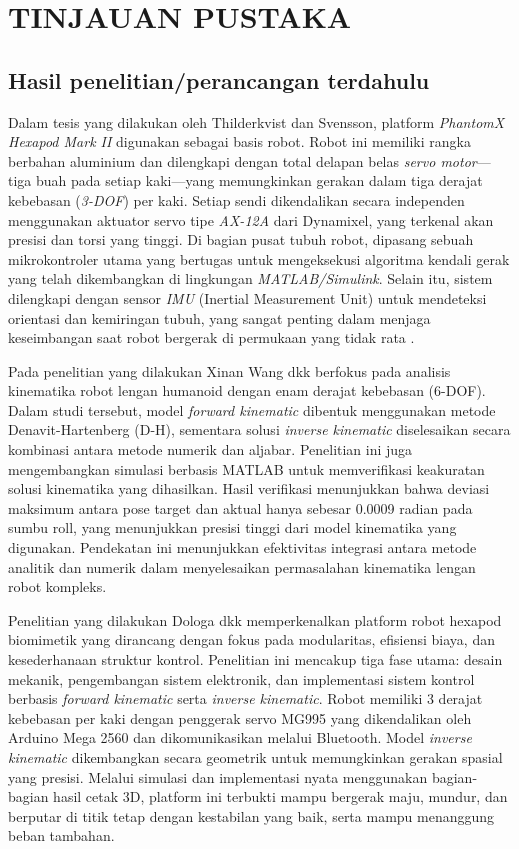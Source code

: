 \chapter{TINJAUAN PUSTAKA}
\label{chap:tinjauanpustaka}


\section{Hasil penelitian/perancangan terdahulu}
\label{Hasil penelitian/perancangan terdahulu}
Dalam tesis yang dilakukan oleh Thilderkvist dan Svensson,
platform \emph{PhantomX Hexapod Mark II} digunakan sebagai basis robot. Robot
ini memiliki rangka berbahan aluminium dan dilengkapi dengan total delapan belas
\emph{servo motor}—tiga buah pada setiap kaki—yang memungkinkan gerakan dalam
tiga derajat kebebasan (\emph{3-DOF}) per kaki. Setiap sendi dikendalikan secara
independen menggunakan aktuator servo tipe \emph{AX-12A} dari Dynamixel, yang
terkenal akan presisi dan torsi yang tinggi. Di bagian pusat tubuh robot,
dipasang sebuah mikrokontroler utama yang bertugas untuk mengeksekusi algoritma
kendali gerak yang telah dikembangkan di lingkungan \emph{MATLAB/Simulink}.
Selain itu, sistem dilengkapi dengan sensor \emph{IMU} (Inertial Measurement
Unit) untuk mendeteksi orientasi dan kemiringan tubuh, yang sangat penting dalam
menjaga keseimbangan saat robot bergerak di permukaan yang tidak rata
\parencite{Thilderkvist2015}.

Pada penelitian yang dilakukan Xinan Wang dkk berfokus pada analisis kinematika robot 
lengan humanoid dengan enam derajat kebebasan (6-DOF). Dalam studi tersebut, model 
\emph{forward kinematic} dibentuk menggunakan metode Denavit-Hartenberg (D-H), sementara solusi 
\emph{inverse kinematic} diselesaikan secara kombinasi antara metode numerik dan aljabar. 
Penelitian ini juga mengembangkan simulasi berbasis MATLAB untuk memverifikasi 
keakuratan solusi kinematika yang dihasilkan. Hasil verifikasi menunjukkan bahwa 
deviasi maksimum antara pose target dan aktual hanya sebesar 0.0009 radian pada sumbu 
roll, yang menunjukkan presisi tinggi dari model kinematika yang digunakan. Pendekatan 
ini menunjukkan efektivitas integrasi antara metode analitik dan numerik dalam 
menyelesaikan permasalahan kinematika lengan robot kompleks. \parencite{wang2024kinematics}

\sloppy
Penelitian yang dilakukan Dologa dkk memperkenalkan platform robot hexapod
biomimetik yang dirancang dengan fokus pada modularitas, efisiensi biaya, dan
kesederhanaan struktur kontrol. Penelitian ini mencakup tiga fase utama: desain
mekanik, pengembangan sistem elektronik, dan implementasi sistem kontrol
berbasis \emph{forward kinematic} serta \emph{inverse kinematic}. Robot memiliki 3 derajat
kebebasan per kaki dengan penggerak servo MG995 yang dikendalikan oleh
Arduino Mega 2560 dan dikomunikasikan melalui Bluetooth. Model \emph{inverse kinematic}
dikembangkan secara geometrik untuk memungkinkan gerakan spasial yang presisi.
Melalui simulasi dan implementasi nyata menggunakan bagian-bagian hasil cetak 3D,
platform ini terbukti mampu bergerak maju, mundur, dan berputar di titik tetap
dengan kestabilan yang baik, serta mampu menanggung beban tambahan. \parencite{10554226}

